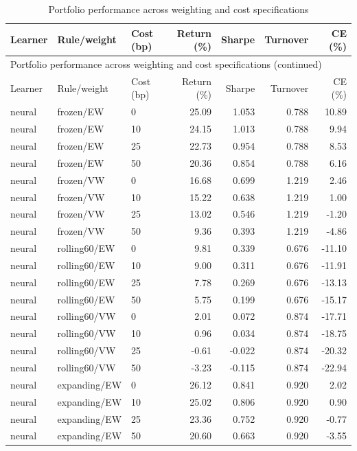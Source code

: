 {\small\setlength{\tabcolsep}{4pt}
\begin{longtable}{@{}lllrrrr@{}}
\caption{Portfolio performance across weighting and cost specifications}\label{tab:portlong}\\
\toprule
Learner & Rule/weight & Cost (bp) & Return (\%) & Sharpe & Turnover & CE (\%)\\\midrule\endfirsthead
\multicolumn{7}{l}{Portfolio performance across weighting and cost specifications (continued)}\\\toprule
Learner & Rule/weight & Cost (bp) & Return (\%) & Sharpe & Turnover & CE (\%)\\\midrule\endhead
\bottomrule\endfoot
neural & frozen/EW & 0 & 25.09 & 1.053 & 0.788 & 10.89\\
neural & frozen/EW & 10 & 24.15 & 1.013 & 0.788 & 9.94\\
neural & frozen/EW & 25 & 22.73 & 0.954 & 0.788 & 8.53\\
neural & frozen/EW & 50 & 20.36 & 0.854 & 0.788 & 6.16\\
neural & frozen/VW & 0 & 16.68 & 0.699 & 1.219 & 2.46\\
neural & frozen/VW & 10 & 15.22 & 0.638 & 1.219 & 1.00\\
neural & frozen/VW & 25 & 13.02 & 0.546 & 1.219 & -1.20\\
neural & frozen/VW & 50 & 9.36 & 0.393 & 1.219 & -4.86\\
neural & rolling60/EW & 0 & 9.81 & 0.339 & 0.676 & -11.10\\
neural & rolling60/EW & 10 & 9.00 & 0.311 & 0.676 & -11.91\\
neural & rolling60/EW & 25 & 7.78 & 0.269 & 0.676 & -13.13\\
neural & rolling60/EW & 50 & 5.75 & 0.199 & 0.676 & -15.17\\
neural & rolling60/VW & 0 & 2.01 & 0.072 & 0.874 & -17.71\\
neural & rolling60/VW & 10 & 0.96 & 0.034 & 0.874 & -18.75\\
neural & rolling60/VW & 25 & -0.61 & -0.022 & 0.874 & -20.32\\
neural & rolling60/VW & 50 & -3.23 & -0.115 & 0.874 & -22.94\\
neural & expanding/EW & 0 & 26.12 & 0.841 & 0.920 & 2.02\\
neural & expanding/EW & 10 & 25.02 & 0.806 & 0.920 & 0.90\\
neural & expanding/EW & 25 & 23.36 & 0.752 & 0.920 & -0.77\\
neural & expanding/EW & 50 & 20.60 & 0.663 & 0.920 & -3.55\\

\end{longtable}}
